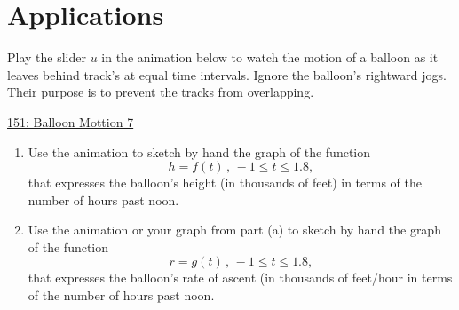 \documentclass{ximera}
\begin{document}
\section*{Applications}

\begin{question}  \label{Qdftgtr45t5t}

Play the slider $u$ in the animation below to watch the motion of a balloon as it leaves behind track's at equal time intervals. Ignore the balloon's rightward jogs. Their purpose is to prevent the tracks from overlapping.

\begin{onlineOnly}
    \begin{center}
\end{center}
\end{onlineOnly}
\end{question}

\href{https://www.desmos.com/calculator/h91txxjcmi}{151: Balloon Mottion 7}


\begin{enumerate}
\item Use the animation to sketch by hand the graph of the function 
\[
   h = f(t) \, , \, -1 \leq t \leq 1.8 ,       
\]
that expresses the balloon's height (in thousands of feet) in terms of the number of hours past noon.

\item Use the animation or your graph from part (a) to sketch by hand the graph of the function 
\[
     r = g(t) \, , \, -1 \leq t \leq 1.8 ,
\]
that expresses the balloon's rate of ascent (in thousands of feet/hour  in terms of the number of hours past noon.

\end{enumerate}
\end{document}
